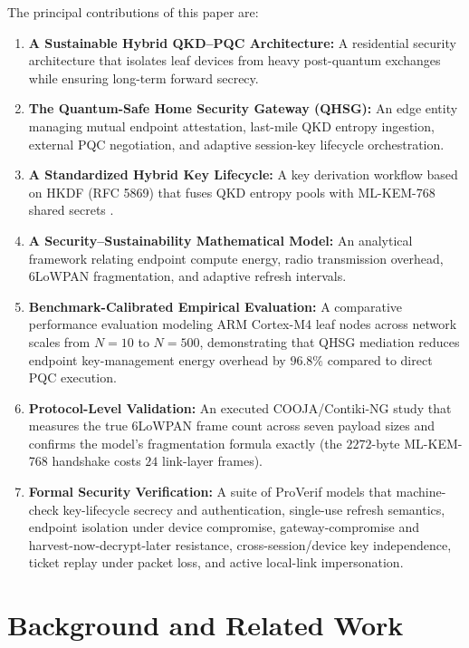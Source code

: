 \documentclass[journal]{IEEEtran}
\begin{document}
The principal contributions of this paper are:
\begin{enumerate}
    \item \textbf{A Sustainable Hybrid QKD--PQC Architecture:} A residential security
    architecture that isolates leaf devices from heavy post-quantum exchanges while ensuring
    long-term forward secrecy.
    \item \textbf{The Quantum-Safe Home Security Gateway (QHSG):} An edge entity managing
    mutual endpoint attestation, last-mile QKD entropy ingestion, external PQC negotiation,
    and adaptive session-key lifecycle orchestration.
    \item \textbf{A Standardized Hybrid Key Lifecycle:} A key derivation workflow based on
    HKDF (RFC 5869) that fuses QKD entropy pools with ML-KEM-768 shared secrets
    \cite{rfc5869,ietfhybrid}.
    \item \textbf{A Security--Sustainability Mathematical Model:} An analytical framework
    relating endpoint compute energy, radio transmission overhead, 6LoWPAN fragmentation,
    and adaptive refresh intervals.
    \item \textbf{Benchmark-Calibrated Empirical Evaluation:} A comparative performance
    evaluation modeling ARM Cortex-M4 leaf nodes across network scales from $N=10$ to $N=500$,
    demonstrating that QHSG mediation reduces endpoint key-management energy overhead by
    $96.8\%$ compared to direct PQC execution.
    \item \textbf{Protocol-Level Validation:} An executed COOJA/Contiki-NG study that
    measures the true 6LoWPAN frame count across seven payload sizes and confirms the
    model's fragmentation formula exactly (the $2272$-byte ML-KEM-768 handshake costs
    $24$ link-layer frames).
    \item \textbf{Formal Security Verification:} A suite of ProVerif models that
    machine-check key-lifecycle secrecy and authentication, single-use refresh
    semantics, endpoint isolation under device compromise, gateway-compromise and
    harvest-now-decrypt-later resistance, cross-session/device key independence, ticket
    replay under packet loss, and active local-link impersonation.
\end{enumerate}


\section{Background and Related Work}
\end{document}
